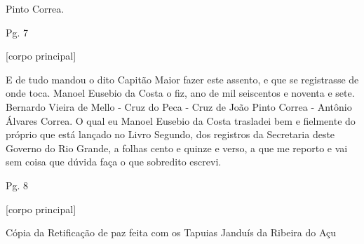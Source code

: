 \begin{refsection}
Pinto Correa.  


    \vspace{5mm}

    \noindent{}Pg. 7

    \vspace{1ex}

    \noindent{}[corpo principal] 

    \vspace{1ex}

    E de tudo mandou o dito Capitão Maior fazer este assento, e que se registrasse de onde toca. Manoel Eusebio da Costa o fiz, ano de mil seiscentos e noventa e sete. Bernardo Vieira de Mello - Cruz do Peca - Cruz de João Pinto Correa - Antônio Álvares Correa. O qual eu Manoel Eusebio da Costa trasladei bem e fielmente do próprio que está lançado no Livro Segundo, dos registros da Secretaria deste Governo do Rio Grande, a folhas cento e quinze e verso, a que me reporto e vai sem coisa que dúvida faça o que sobredito escrevi. 


    \vspace{5mm}

    \noindent{}Pg. 8

    \vspace{1ex}

    \noindent{}[corpo principal] 

    \vspace{1ex}

    Cópia da Retificação de paz feita com os Tapuias Janduís da Ribeira do Açu  


\end{refsection}
